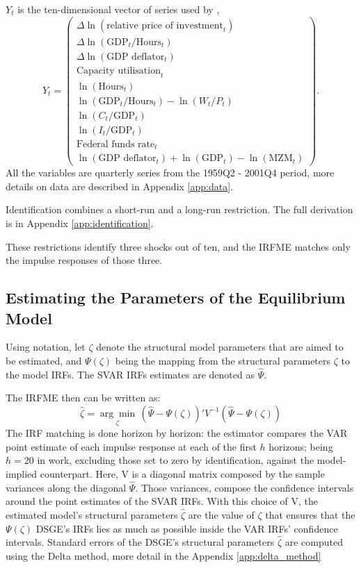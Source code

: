 \documentclass[12pt, a4paper]{article}
\begin{document}
$Y_t$ is the ten-dimensional vector of series used by \citet{ACEL2011},
\begin{equation}
    Y_t =
    \begin{pmatrix}
        \Delta\ln(\text{relative price of investment}_t) \\
        \Delta\ln(\text{GDP}_t/\text{Hours}_t) \\
        \Delta\ln(\text{GDP deflator}_t) \\
        \text{Capacity utilisation}_t \\
        \ln(\text{Hours}_t) \\
        \ln(\text{GDP}_t/\text{Hours}_t) - \ln(W_t/P_t) \\
        \ln(C_t/\text{GDP}_t) \\
        \ln(I_t/\text{GDP}_t) \\
        \text{Federal funds rate}_t \\
        \ln(\text{GDP deflator}_t) + \ln(\text{GDP}_t) - \ln(\text{MZM}_t)
    \end{pmatrix} .
    \label{eq:Yt}
\end{equation}
All the variables are quarterly series from the 1959Q2 - 2001Q4 period, more details on data 
are described in Appendix \ref{app:data}.

Identification combines a short-run and a long-run restriction. The full derivation
is in Appendix \ref{app:identification}.

These restrictions identify three shocks out of ten, and the IRFME matches only the impulse responses of
those three.

\subsection{Estimating the Parameters of the Equilibrium Model}
Using \citet{ACEL2011} notation, let $\zeta$ denote the structural model parameters that are aimed to be estimated, and $\Psi(\zeta)$ being the mapping 
from the structural parameters $\zeta$ to the model IRFs. The SVAR IRFs estimates are denoted as $\hat{\Psi}$.

The IRFME then can be written as:
\begin{equation}
    \hat{\zeta} = \underset{\zeta}{\arg\min} \, (\hat{\Psi} - \Psi(\zeta))' V^{-1} (\hat{\Psi} - \Psi(\zeta))
    \label{eq:irfme}
\end{equation}
The IRF matching is done horizon by horizon: the estimator compares the VAR
point estimate of each impulse response at each of the first $h$ horizons; being $h=20$ in \citet{ACEL2011} work, excluding
those set to zero by identification, against the model-implied counterpart. 
Here, V is a diagonal matrix composed by the sample variances along the diagonal $\hat{\Psi}$.
Those variances, compose the confidence intervals around the point estimates of the SVAR IRFs.
With this choice of V, the estimated model's structural parameters $\hat{\zeta}$ are the value 
of ${\zeta}$ that ensures that the $\Psi(\zeta)$ DSGE's IRFs lies as much as possible inside the 
VAR IRFs' confidence intervals. Standard errors of the DSGE's structural parameters $\hat{\zeta}$ 
are computed using the Delta method, more detail in the Appendix \ref{app:delta_method}
\end{document}
